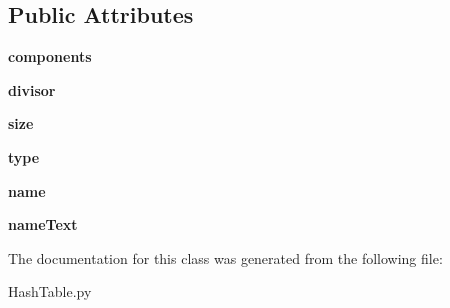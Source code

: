 \subsection*{Public Attributes}
\begin{DoxyCompactItemize}
\item 
\mbox{\label{class_hash_table_1_1_hash_table_ad5fb3032994116073ad71ba60c86acb5}} 
{\bfseries components}
\item 
\mbox{\label{class_hash_table_1_1_hash_table_a0adcbe4989d7c2285cd0fe6697fd8c46}} 
{\bfseries divisor}
\item 
\mbox{\label{class_hash_table_1_1_hash_table_aa82e53189cbd1b67c0a5b48e701ea487}} 
{\bfseries size}
\item 
\mbox{\label{class_hash_table_1_1_hash_table_a5cfd51a9f298bea34df8df10de3683e6}} 
{\bfseries type}
\item 
\mbox{\label{class_hash_table_1_1_hash_table_a4bee7a958ad508dd6206721d53325ed3}} 
{\bfseries name}
\item 
\mbox{\label{class_hash_table_1_1_hash_table_a57399e529868b9182c8dc128a877ccb2}} 
{\bfseries name\+Text}
\end{DoxyCompactItemize}


The documentation for this class was generated from the following file\+:\begin{DoxyCompactItemize}
\item 
Hash\+Table.\+py\end{DoxyCompactItemize}
